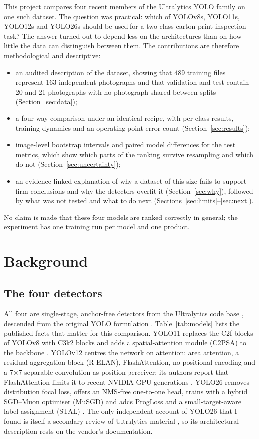 \documentclass[11pt,a4paper]{article}
\begin{document}
This project compares four recent members of the Ultralytics YOLO family on one such dataset. The question was practical: which of YOLOv8s, YOLO11s, YOLO12s and YOLO26s should be used for a two-class carton-print inspection task? The answer turned out to depend less on the architectures than on how little the data can distinguish between them. The contributions are therefore methodological and descriptive:
\begin{itemize}[leftmargin=1.4em,itemsep=1pt]
  \item an audited description of the dataset, showing that 489 training files represent 163 independent photographs and that validation and test contain 20 and 21 photographs with no photograph shared between splits (Section~\ref{sec:data});
  \item a four-way comparison under an identical recipe, with per-class results, training dynamics and an operating-point error count (Section~\ref{sec:results});
  \item image-level bootstrap intervals and paired model differences for the test metrics, which show which parts of the ranking survive resampling and which do not (Section~\ref{sec:uncertainty});
  \item an evidence-linked explanation of why a dataset of this size fails to support firm conclusions and why the detectors overfit it (Section~\ref{sec:why}), followed by what was not tested and what to do next (Sections~\ref{sec:limits}--\ref{sec:next}).
\end{itemize}
No claim is made that these four models are ranked correctly in general; the experiment has one training run per model and one product.

\section{Background}
\subsection{The four detectors}
All four are single-stage, anchor-free detectors from the Ultralytics code base \cite{ultralytics_software}, descended from the original YOLO formulation \cite{redmon2015yolo}. Table~\ref{tab:models} lists the published facts that matter for this comparison. YOLO11 replaces the C2f blocks of YOLOv8 with C3k2 blocks and adds a spatial-attention module (C2PSA) to the backbone \cite{ultralytics_yolo11_vs_v8}. YOLOv12 centres the network on attention: area attention, a residual aggregation block (R-ELAN), FlashAttention, no positional encoding and a 7$\times$7 separable convolution as position perceiver; its authors report that FlashAttention limits it to recent NVIDIA GPU generations \cite{tian2025yolov12}. YOLO26 removes distribution focal loss, offers an NMS-free one-to-one head, trains with a hybrid SGD--Muon optimiser (MuSGD) and adds ProgLoss and a small-target-aware label assignment (STAL) \cite{ultralytics_yolo26_vs_11,chakrabarty2026yolo26}. The only independent account of YOLO26 that I found is itself a secondary review of Ultralytics material \cite{chakrabarty2026yolo26}, so its architectural description rests on the vendor's documentation.
\end{document}
